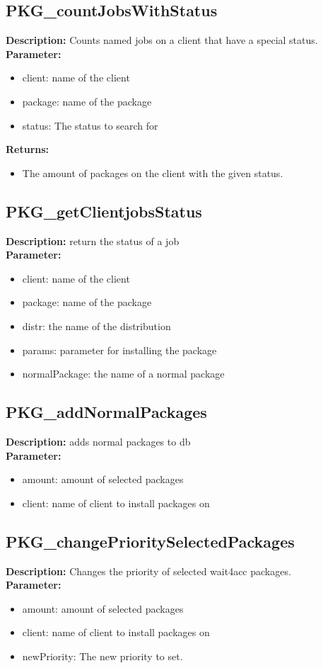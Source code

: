 \subsection{PKG\_countJobsWithStatus}
\textbf{Description:} Counts named jobs on a client that have a special status.\\
\textbf{Parameter:}
\begin{itemize}
\item client: name of the client
\item package: name of the package
\item status: The status to search for
\end{itemize}
\textbf{Returns:}
\begin{itemize}
\item The amount of packages on the client with the given status.
\end{itemize}

\subsection{PKG\_getClientjobsStatus}
\textbf{Description:} return the status of a job\\
\textbf{Parameter:}
\begin{itemize}
\item client: name of the client
\item package: name of the package
\item distr: the name of the distribution
\item params: parameter for installing the package
\item normalPackage: the name of a normal package
\end{itemize}

\subsection{PKG\_addNormalPackages}
\textbf{Description:} adds normal packages to db\\
\textbf{Parameter:}
\begin{itemize}
\item amount: amount of selected packages
\item client: name of client to install packages on
\end{itemize}

\subsection{PKG\_changePrioritySelectedPackages}
\textbf{Description:} Changes the priority of selected wait4acc packages.\\
\textbf{Parameter:}
\begin{itemize}
\item amount: amount of selected packages
\item client: name of client to install packages on
\item newPriority: The new priority to set.
\end{itemize}

